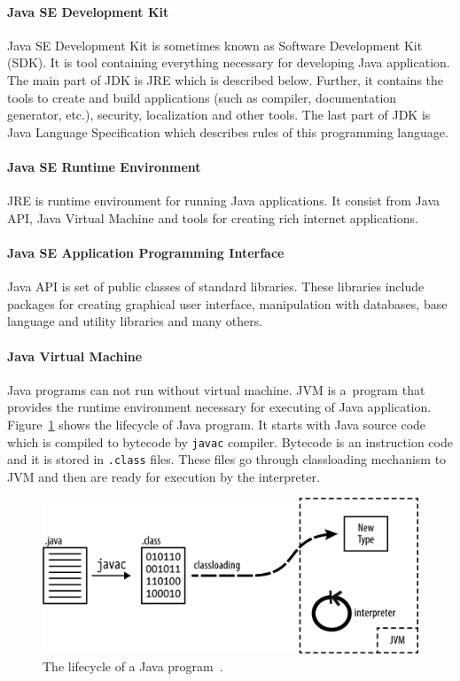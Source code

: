 \paragraph{Java SE Development Kit}
Java SE Development Kit is sometimes known as Software Development Kit (SDK). It is tool containing everything necessary
for developing Java application. The main part of JDK is JRE which is described below. Further, it contains the tools
to create and build applications (such as compiler, documentation generator, etc.), security, localization and other
tools. The last part of JDK is Java Language Specification which describes rules of this programming language.

\paragraph{Java SE Runtime Environment}
JRE is runtime environment for running Java applications. It consist from Java API, Java Virtual Machine and tools for
creating rich internet applications.

\paragraph{Java SE Application Programming Interface}
Java API is set of public classes of standard libraries. These libraries include packages for creating graphical user
interface, manipulation with databases, base language and utility libraries and many others.

\paragraph{Java Virtual Machine}
Java programs can not run without virtual machine. JVM is a~program that provides the runtime environment necessary for
executing of Java application. Figure~\ref{JavaLifecycle} shows the lifecycle of Java program. It starts with Java
source code which is compiled to bytecode by \texttt{javac} compiler. Bytecode is an instruction code and it is stored
in \texttt{.class} files. These files go through classloading mechanism to JVM and then are ready for execution by the
interpreter.

\begin{figure}[h!]
    \centering
    \includegraphics[scale=0.3]{fig/java_program_lifecycle.png}
    \caption{The lifecycle of a Java program~\cite{JavaBook}.}
    \label{JavaLifecycle}
\end{figure}
